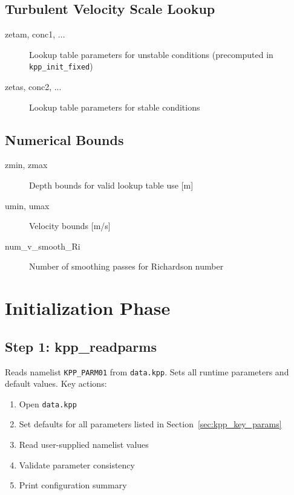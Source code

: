 \documentclass[11pt, a4paper]{article}
\begin{document}
\subsection{Turbulent Velocity Scale Lookup}

\begin{description}
    \item[zetam, conc1, ...] Lookup table parameters for unstable conditions (precomputed in \texttt{kpp\_init\_fixed})
    \item[zetas, conc2, ...] Lookup table parameters for stable conditions
\end{description}

\subsection{Numerical Bounds}

\begin{description}
    \item[zmin, zmax] Depth bounds for valid lookup table use [m]
    \item[umin, umax] Velocity bounds [m/s]
    \item[num\_v\_smooth\_Ri] Number of smoothing passes for Richardson number
\end{description}

\section{Initialization Phase}

\subsection{Step 1: kpp\_readparms}

Reads namelist \texttt{KPP\_PARM01} from \texttt{data.kpp}. Sets all runtime parameters and default values. Key actions:

\begin{enumerate}
    \item Open \texttt{data.kpp}
    \item Set defaults for all parameters listed in Section~\ref{sec:kpp_key_params}
    \item Read user-supplied namelist values
    \item Validate parameter consistency
    \item Print configuration summary
\end{enumerate}
\end{document}
